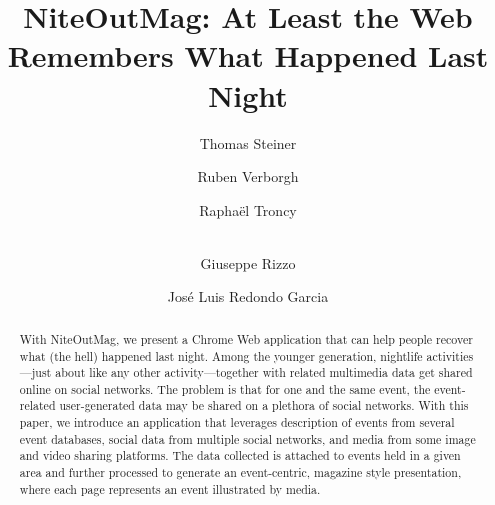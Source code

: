 \documentclass[runningheads,a4paper]{llncs}
\begin{document}
\title{NiteOutMag: At Least the Web\\ Remembers What Happened Last Night}

\author{Thomas Steiner \and
		Ruben Verborgh \and
        Rapha\"el Troncy \and\\
		Giuseppe Rizzo \and
		José Luis Redondo Garcia		
}


\maketitle

\begin{abstract}
With NiteOutMag, we present a Chrome Web application that can help people recover what (the hell) happened last night. Among the younger generation, nightlife activities---just about like any other activity---together with related multimedia data get shared online on social networks. The problem is that for one and the same event, the event-related user-generated data may be shared on a plethora of social networks. With this paper, we introduce an application that leverages description of events from several event databases, social data from multiple social networks, and media from some image and video sharing platforms. The data collected is attached to events held in a given area and further processed to generate an event-centric, magazine style presentation, where each page represents an event illustrated by media.
\end{abstract}

\end{document}
